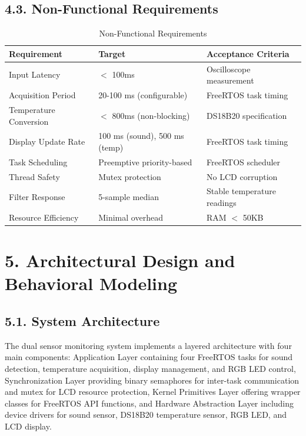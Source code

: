 \documentclass[12pt]{article}
\begin{document}
\subsection*{4.3. Non-Functional Requirements}

\begin{table}[H]
	\centering
	\caption{Non-Functional Requirements}
	\label{tab:non-functional-requirements}
	\begin{tabular}{|l|l|l|}
		\hline
		\textbf{Requirement} & \textbf{Target} & \textbf{Acceptance Criteria} \\
		\hline
		Input Latency & $<$ 100ms & Oscilloscope measurement \\
		\hline
		Acquisition Period & 20-100 ms (configurable) & FreeRTOS task timing \\
		\hline
		Temperature Conversion & $<$ 800ms (non-blocking) & DS18B20 specification \\
		\hline
		Display Update Rate & 100 ms (sound), 500 ms (temp) & FreeRTOS task timing \\
		\hline
		Task Scheduling & Preemptive priority-based & FreeRTOS scheduler \\
		\hline
		Thread Safety & Mutex protection & No LCD corruption \\
		\hline
		Filter Response & 5-sample median & Stable temperature readings \\
		\hline
		Resource Efficiency & Minimal overhead & RAM $<$ 50KB \\
		\hline
	\end{tabular}
\end{table}

\section*{5. Architectural Design and Behavioral Modeling}

\subsection*{5.1. System Architecture}

The dual sensor monitoring system implements a layered architecture with four main components: Application Layer containing four FreeRTOS tasks for sound detection, temperature acquisition, display management, and RGB LED control, Synchronization Layer providing binary semaphores for inter-task communication and mutex for LCD resource protection, Kernel Primitives Layer offering wrapper classes for FreeRTOS API functions, and Hardware Abstraction Layer including device drivers for sound sensor, DS18B20 temperature sensor, RGB LED, and LCD display.
\end{document}
